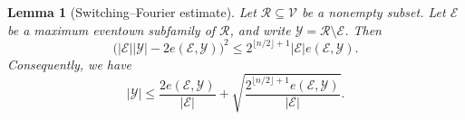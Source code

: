 \documentclass[10pt,a4paper]{amsart}
\newtheorem{lemma}{Lemma}
\begin{document}
\begin{lemma}[Switching--Fourier estimate]\label{lem:switching-fourier}
Let \(\mathcal R\subseteq\mathcal V\) be a nonempty subset. Let \(\mathcal E\) be a
maximum eventown subfamily of \(\mathcal R\), and write \(\mathcal Y=\mathcal R\setminus\mathcal E\). 
Then
\begin{equation}
 \bigl(|\mathcal E||\mathcal Y|-2e(\mathcal E,\mathcal Y)\bigr)^2
 \le
 2^{\lfloor n/2\rfloor+1}|\mathcal E|e(\mathcal E,\mathcal Y).
\label{eq:switching-fourier}
\end{equation}
Consequently, we have
\begin{equation}
 |\mathcal Y|
 \le
 \frac{2e(\mathcal E,\mathcal Y)}{|\mathcal E|}
 +
 \sqrt{
       \frac{2^{\lfloor n/2\rfloor+1}e(\mathcal E,\mathcal Y)}{|\mathcal E|}
      }.
\label{eq:remainder-bound}
\end{equation}
\end{lemma}
\end{document}
